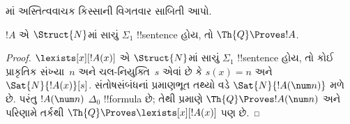 \documentclass[../../../include/open-logic-section]{subfiles}
\begin{document}
\begin{prob}
માં
અસ્તિત્વવાચક કિસ્સાની વિગતવાર
સાબિતી આપો.
\end{prob}

\begin{thm}
$!A$ એ $\Struct{N}$માં સાચું
$\Sigma_1$ !!{sentence} હોય,
તો $\Th{Q} \Proves !A$.
\end{thm}

\begin{proof}
$\lexists[x][!A(x)]$ એ
$\Struct{N}$માં સાચું
$\Sigma_1$ !!{sentence}
હોય, તો કોઈ પ્રાકૃતિક
સંખ્યા~$n$ અને ચલ-નિયુક્તિ~$s$
એવાં છે કે $s(x) = n$ અને
$\Sat{N}{!A(x)}[s]$.
સંતોષસંબંધનાં પ્રમાણભૂત
તથ્યો વડે $\Sat{N}{!A(\num n)}$
મળે છે. પરંતુ $!A(\num n)$
$\Delta_0$ !!{formula} છે;
તેથી 
પ્રમાણે $\Th{Q} \Proves
!A(\num n)$ અને પરિણામે
તર્કથી $\Th{Q} \Proves
\lexists[x][!A(x)]$ પણ છે.
\end{proof}
\end{document}
